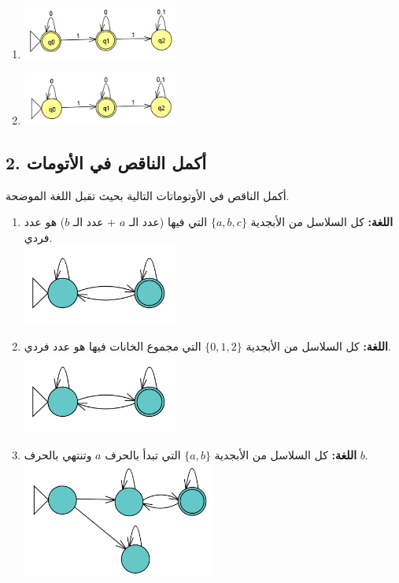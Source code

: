 \documentclass[12pt]{article}
\begin{document}
\begin{enumerate}
\item
\includegraphics[width=0.4\textwidth]{../../../images/DFAs/ex1_q12.png}

\item
\includegraphics[width=0.4\textwidth]{../../../images/DFAs/ex1_q13.png}

\end{enumerate}

\clearpage
\subsection*{2. أكمل الناقص في الأتومات}
أكمل الناقص في الأوتوماتات التالية بحيث تقبل اللغة الموضحة.

\begin{enumerate}

\item
\textbf{اللغة:} كل السلاسل من الأبجدية $\{a, b, c\}$ التي فيها (عدد الـ $a$ + عدد الـ $b$) هو عدد فردي. \\
\includegraphics[width=0.4\textwidth]{../../../images/DFAs/ex1_p2_q1.png}

\item
\textbf{اللغة:} كل السلاسل من الأبجدية $\{0, 1, 2\}$ التي مجموع الخانات فيها هو عدد فردي. \\
\includegraphics[width=0.4\textwidth]{../../../images/DFAs/ex1_p2_q1.png}

\item
\textbf{اللغة:} كل السلاسل من الأبجدية $\{a, b\}$ التي تبدأ بالحرف $a$ وتنتهي بالحرف $b$. \\
\includegraphics[width=0.5\textwidth]{../../../images/DFAs/ex1_p2_q3.png}


\end{enumerate}
\end{document}
